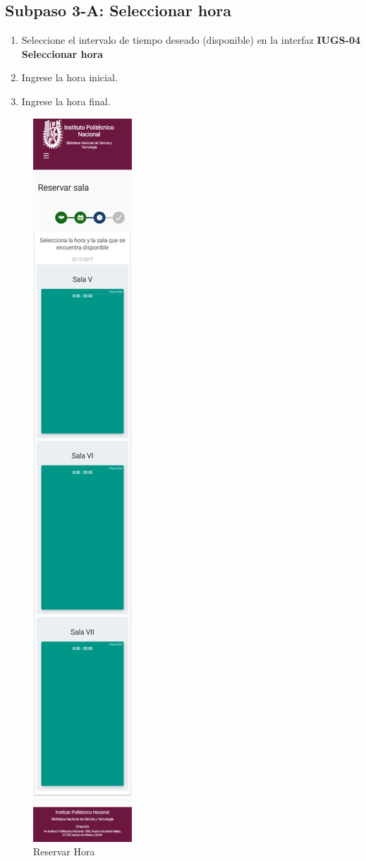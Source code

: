 \subsection{Subpaso 3-A: Seleccionar hora}
\begin{enumerate}
	\item Seleccione el intervalo de tiempo deseado (disponible) en la interfaz  \textbf{IUGS-04 Seleccionar hora}
	\item Ingrese la hora inicial.
	\item Ingrese la hora final.
\end{enumerate}

\begin{figure}[hbtp]	
		\includegraphics[scale=0.3]{images/InterfazMovil/IUGS02_reservarHoraSolicitante.png}
		\caption{Reservar Hora}
		
		\end{figure}
